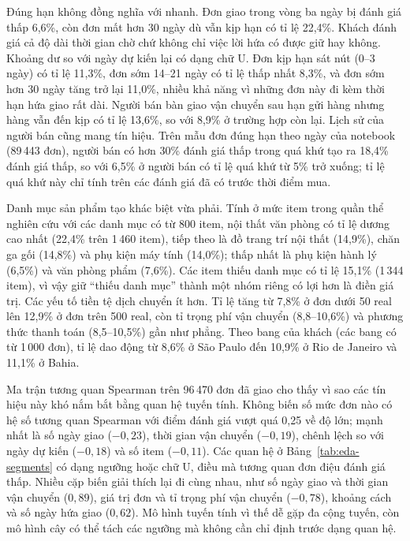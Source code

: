 Đúng hạn không đồng nghĩa với nhanh. Đơn giao trong vòng ba ngày bị đánh giá thấp 6,6\%, còn đơn mất hơn 30 ngày dù vẫn kịp hạn có tỉ lệ 22,4\%. Khách đánh giá cả độ dài thời gian chờ chứ không chỉ việc lời hứa có được giữ hay không. Khoảng dư so với ngày dự kiến lại có dạng chữ U. Đơn kịp hạn sát nút (0--3 ngày) có tỉ lệ 11,3\%, đơn sớm 14--21 ngày có tỉ lệ thấp nhất 8,3\%, và đơn sớm hơn 30 ngày tăng trở lại 11,0\%, nhiều khả năng vì những đơn này đi kèm thời hạn hứa giao rất dài. Người bán bàn giao vận chuyển sau hạn gửi hàng nhưng hàng vẫn đến kịp có tỉ lệ 13,6\%, so với 8,9\% ở trường hợp còn lại. Lịch sử của người bán cũng mang tín hiệu. Trên mẫu đơn đúng hạn theo ngày của notebook (89\,443 đơn), người bán có hơn 30\% đánh giá thấp trong quá khứ tạo ra 18,4\% đánh giá thấp, so với 6,5\% ở người bán có tỉ lệ quá khứ từ 5\% trở xuống; tỉ lệ quá khứ này chỉ tính trên các đánh giá đã có trước thời điểm mua.

Danh mục sản phẩm tạo khác biệt vừa phải. Tính ở mức item trong quần thể nghiên cứu với các danh mục có từ 800 item, nội thất văn phòng có tỉ lệ dương cao nhất (22,4\% trên 1\,460 item), tiếp theo là đồ trang trí nội thất (14,9\%), chăn ga gối (14,8\%) và phụ kiện máy tính (14,0\%); thấp nhất là phụ kiện hành lý (6,5\%) và văn phòng phẩm (7,6\%). Các item thiếu danh mục có tỉ lệ 15,1\% (1\,344 item), vì vậy giữ ``thiếu danh mục'' thành một nhóm riêng có lợi hơn là điền giá trị. Các yếu tố tiền tệ dịch chuyển ít hơn. Tỉ lệ tăng từ 7,8\% ở đơn dưới 50 real lên 12,9\% ở đơn trên 500 real, còn tỉ trọng phí vận chuyển (8,8--10,6\%) và phương thức thanh toán (8,5--10,5\%) gần như phẳng. Theo bang của khách (các bang có từ 1\,000 đơn), tỉ lệ dao động từ 8,6\% ở São Paulo đến 10,9\% ở Rio de Janeiro và 11,1\% ở Bahia.

Ma trận tương quan Spearman trên 96\,470 đơn đã giao cho thấy vì sao các tín hiệu này khó nắm bắt bằng quan hệ tuyến tính. Không biến số mức đơn nào có hệ số tương quan Spearman với điểm đánh giá vượt quá 0,25 về độ lớn; mạnh nhất là số ngày giao ($-0{,}23$), thời gian vận chuyển ($-0{,}19$), chênh lệch so với ngày dự kiến ($-0{,}18$) và số item ($-0{,}11$). Các quan hệ ở Bảng~\ref{tab:eda-segments} có dạng ngưỡng hoặc chữ U, điều mà tương quan đơn điệu đánh giá thấp. Nhiều cặp biến giải thích lại đi cùng nhau, như số ngày giao và thời gian vận chuyển ($0{,}89$), giá trị đơn và tỉ trọng phí vận chuyển ($-0{,}78$), khoảng cách và số ngày hứa giao ($0{,}62$). Mô hình tuyến tính vì thế dễ gặp đa cộng tuyến, còn mô hình cây có thể tách các ngưỡng mà không cần chỉ định trước dạng quan hệ.

